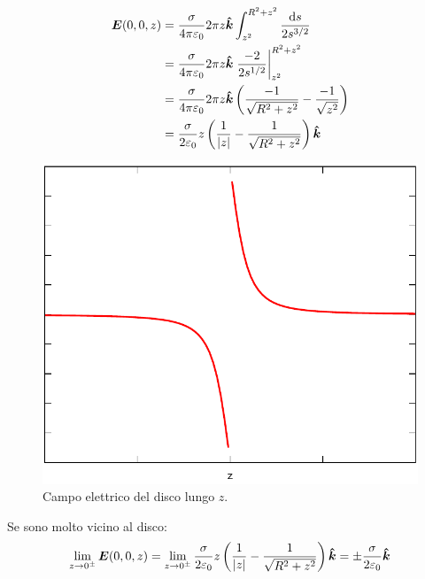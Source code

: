 \begin{Es}[Disco]
  \begin{align*}
    \boldsymbol{E}(0,0,z) & =\frac{\sigma}{4\pi\varepsilon_0}2\pi z\boldsymbol{\hat {k}}\int_{z^2}^{R^2+z^2}\frac{\mathrm{d} s}{2s^{3/2}}                   \\
                 & =\frac{\sigma}{4\pi\varepsilon_0}2\pi z\boldsymbol{\hat {k}}\left.\frac{-2}{2s^{1/2}}\right|_{z^2}^{R^2+z^2}             \\
                 & =\frac{\sigma}{4\pi\varepsilon_0}2\pi z\boldsymbol{\hat {k}}\left(\frac{-1}{\sqrt{R^2+z^2}}-\frac{-1}{\sqrt{z^2}}\right) \\
                 & =\frac{\sigma}{2\varepsilon_0} z\left(\frac{1}{|z|}-\frac{1}{\sqrt{R^2+z^2}}\right)\boldsymbol{\hat {k}}
  \end{align*}
  \begin{figure}[htbp]
    \centering
    \includegraphics[scale=0.5]{immagini/fisica2/potenziale_disco}
    \caption{Campo elettrico del disco lungo $z$.}
  \end{figure}

  Se sono molto vicino al disco:
  \[
    \lim_{z\to 0^\pm}\boldsymbol{E}(0,0,z)=\lim_{z\to 0^\pm} \frac{\sigma}{2\varepsilon_0} z\left(\frac{1}{|z|}-\frac{1}{\sqrt{R^2+z^2}}\right)\boldsymbol{\hat {k}}=\pm\frac{\sigma}{2\varepsilon_0}\boldsymbol{\hat {k}}
  \]
\end{Es}
